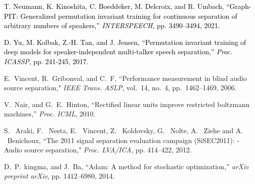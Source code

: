 \documentclass[honka]{nitkagawathesis}%
\newcommand{\red}[1]{\textcolor{black}{#1}}
\begin{document}
\begin{thebibliography}{99}
  \red{T. Neumann, K. Kinoshita, C. Boeddeker, M. Delcroix, and R. Umbach, ``Graph-PIT: Generalized permutation invariant training for continuous separation of arbitrary numbers of speakers,'' {\em INTERSPEECH}, pp. 3490--3494, 2021.}

  \red{ D. Yu, M. Kolbak, Z.-H. Tan, and J. Jensen, ``Permutation invariant training of deep models for speaker-independent multi-talker speech separation,'' {\em Proc. ICASSP}, pp. 241-245, 2017. }

  E.~Vincent, R.~Gribonval, and C.~F, ``Performance measurement in blind audio source separation," {\em IEEE Trans. ASLP}, vol.~14, no.~4, pp.~1462--1469, 2006.
  
  V.~Nair, and G.~E.~Hinton, ``Rectified linear units improve restricted boltzmann machines,'' 
  {\em Proc. ICML}, 2010.
  
  S. ~Araki, F. ~Nesta, E. ~Vincent, Z. ~Koldovsky, G. ~Nolte, A. ~Ziehe and A. ~Benichoux, ``The 2011 signal separation evaluation campaign (SiSEC2011): -Audio source separation," {\em Proc. LVA/ICA}, pp. 414--422, 2012.
  
  D.~P.~kingma, and J.~Ba, ``Adam: A method for stochastic optimization,''
  {\em arXiv preprint arXiv}, pp. 1412--6980, 2014.
  
\end{thebibliography}


% 



\appendix


\end{document}
